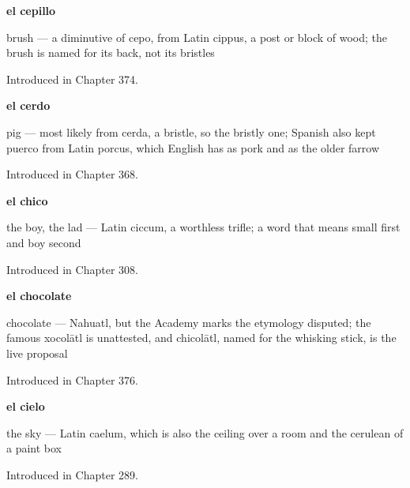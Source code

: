 \noindent\begin{minipage}[t]{\linewidth}
\raggedright
\textbf{el cepillo}\par
\small brush — a diminutive of cepo, from Latin cippus, a post or block of wood; the brush is named for its back, not its bristles\par
\footnotesize Introduced in Chapter 374.
\end{minipage}\par\medskip

\noindent\begin{minipage}[t]{\linewidth}
\raggedright
\textbf{el cerdo}\par
\small pig — most likely from cerda, a bristle, so the bristly one; Spanish also kept puerco from Latin porcus, which English has as pork and as the older farrow\par
\footnotesize Introduced in Chapter 368.
\end{minipage}\par\medskip

\noindent\begin{minipage}[t]{\linewidth}
\raggedright
\textbf{el chico}\par
\small the boy, the lad --- Latin ciccum, a worthless trifle; a word that means small first and boy second\par
\footnotesize Introduced in Chapter 308.
\end{minipage}\par\medskip

\noindent\begin{minipage}[t]{\linewidth}
\raggedright
\textbf{el chocolate}\par
\small chocolate — Nahuatl, but the Academy marks the etymology disputed; the famous xocolātl is unattested, and chicolātl, named for the whisking stick, is the live proposal\par
\footnotesize Introduced in Chapter 376.
\end{minipage}\par\medskip

\noindent\begin{minipage}[t]{\linewidth}
\raggedright
\textbf{el cielo}\par
\small the sky — Latin caelum, which is also the ceiling over a room and the cerulean of a paint box\par
\footnotesize Introduced in Chapter 289.
\end{minipage}\par\medskip

